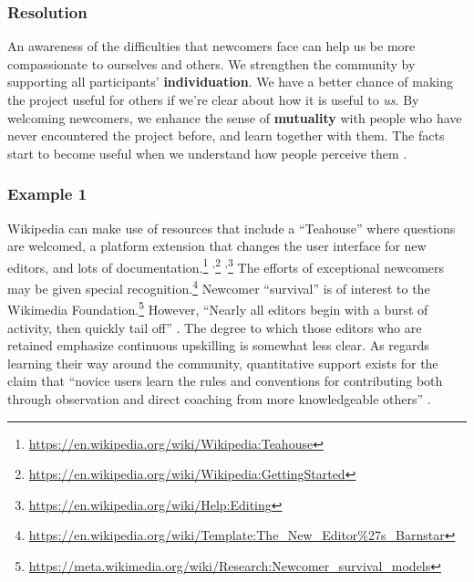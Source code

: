 \subsubsection*{Resolution}
An awareness of the difficulties that newcomers face can help us be
more compassionate to ourselves and others.  We strengthen the
community by supporting all participants' \textbf{individuation}.  We
have a better chance of making the project useful for others if we're
clear about how it is useful to \emph{us}.  By welcoming newcomers, we
enhance the sense of \textbf{mutuality} with people who have never
encountered the project before, and learn together with them.  The
facts start to become useful when we understand how people perceive
them \cite{freire1982creating}.


\subsubsection*{Example 1} Wikipedia  can make use of resources that
include a ``Teahouse'' where questions are welcomed, a platform
extension that changes the user interface for new editors, and lots of
documentation.\footnote{\url{https://en.wikipedia.org/wiki/Wikipedia:Teahouse}}%
\textsuperscript{,}\footnote{\url{https://en.wikipedia.org/wiki/Wikipedia:GettingStarted}}%
\textsuperscript{,}\footnote{\url{https://en.wikipedia.org/wiki/Help:Editing}}
The efforts of exceptional newcomers may be given special
recognition.\footnote{\url{https://en.wikipedia.org/wiki/Template:The_New_Editor\%27s_Barnstar}}
Newcomer ``survival'' is of interest to the Wikimedia
Foundation.\footnote{\url{https://meta.wikimedia.org/wiki/Research:Newcomer_survival_models}}
However, ``Nearly all editors begin with a burst of activity, then
quickly tail off'' \cite{panciera2009wikipedians}.  The degree to
which those editors who are retained emphasize continuous upskilling
is somewhat less clear.  As regards learning their way around the
community, quantitative support exists \cite{panciera2009wikipedians}
for the claim that ``novice users learn the rules and conventions for
contributing both through observation and direct coaching from more
knowledgeable others'' \cite{bryant2005becoming}.

